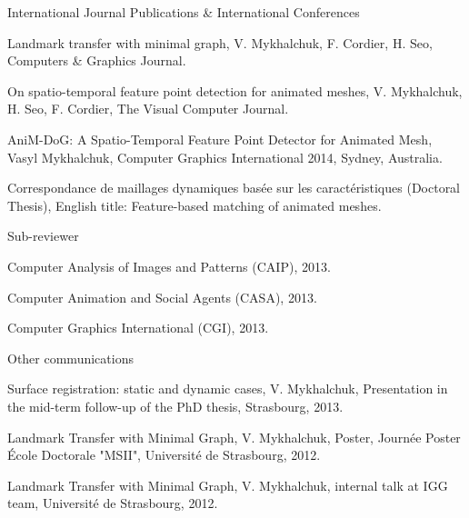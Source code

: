 
\begin{cventries}
  \cventry
    {} %
    {International Journal Publications \& International Conferences} %
    { } %
    { } %
    {
      \begin{cvitems} %
        \item {Landmark transfer with minimal graph, V. Mykhalchuk, F. Cordier, H. Seo, Computers \& Graphics Journal.}
        \item {On spatio-temporal feature point detection for animated meshes, V. Mykhalchuk, H. Seo, F. Cordier, The Visual Computer Journal.}
        \item {AniM-DoG: A Spatio-Temporal Feature Point Detector for Animated Mesh, Vasyl Mykhalchuk, Computer Graphics International 2014, Sydney, Australia.}
        \item {Correspondance de maillages dynamiques basée sur les caractéristiques (Doctoral Thesis), English title: Feature-based matching of animated meshes.}
      \vspace{-5.0mm}
      \end{cvitems}
    }
   
   \cventry
   {}
   {\vspace{-7.0mm}Sub-reviewer}
   {}
   {}
   {
     \begin{cvitems}
     \item{Computer Analysis of Images and Patterns (CAIP), 2013.}
     \item{Computer Animation and Social Agents (CASA), 2013.}
	 \item{Computer Graphics International (CGI), 2013.}
	 \vspace{-5.0mm}
     \end{cvitems}
   } %
   
   \cventry
   {}
   {\vspace{-7.0mm}Other communications}
   {}
   {}
   {
     \begin{cvitems}
     \item Surface registration: static and dynamic cases, V. Mykhalchuk, Presentation in the mid-term  follow-up of the PhD thesis, Strasbourg, 2013. 
\item Landmark Transfer with Minimal Graph, V. Mykhalchuk, Poster, Journée Poster École Doctorale  "MSII", Université de Strasbourg, 2012. 
\item Landmark Transfer with Minimal Graph, V. Mykhalchuk, internal talk at IGG team, Université  de Strasbourg, 2012.
\vspace{-0.0mm}
     \end{cvitems}
   }
   

\end{cventries}
